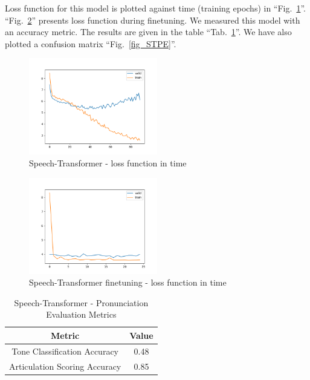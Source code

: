 \documentclass[conference]{IEEEtran}
\begin{document}
Loss function for this model is plotted against time (training epochs) in ``Fig.~\ref{STLoss}''.
``Fig.~\ref{STLossFT}'' presents loss function during finetuning.
We measured this model with an accuracy metric. The results are given in the table ``Tab.~\ref{tab_STPE}''. We have also plotted a confusion matrix ``Fig.~\ref{fig_STPE}''.

\begin{figure}[hbtp]
    \centerline{\includegraphics[width=0.5\textwidth]{Figures/Fig_ST_loss.png}}
    \caption{Speech-Transformer - loss function in time}
    \label{STLoss} %
    \end{figure}

\begin{figure}[hbtp]
    \centerline{\includegraphics[width=0.5\textwidth]{Figures/Fig_ST_Finetuning_loss.png}}
    \caption{Speech-Transformer finetuning - loss function in time}
    \label{STLossFT} %
    \end{figure}

\begin{table}[hbtp]
\caption{Speech-Transformer - Pronunciation Evaluation Metrics}
\begin{center}
\begin{tabular}{|c|c|}
\hline
\textbf{Metric} & {\textbf{Value}} \\
\hline
Tone Classification Accuracy & 0.48 \\
\hline
Articulation Scoring Accuracy & 0.85 \\
\hline
\end{tabular}
\label{tab_STPE}
\end{center}
\end{table}
\end{document}
